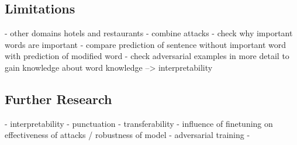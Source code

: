 \subsection{Limitations}

- other domains hotels and restaurants
- combine attacks
- check why important words are important
- compare prediction of sentence without important word with prediction of modified word
- check adversarial examples in more detail to gain knowledge about word knowledge --> interpretability


\subsection{Further Research}
- interpretability
- punctuation
- transferability
- influence of finetuning on effectiveness of attacks / robustness of model
- adversarial training
- 





\FloatBarrier


